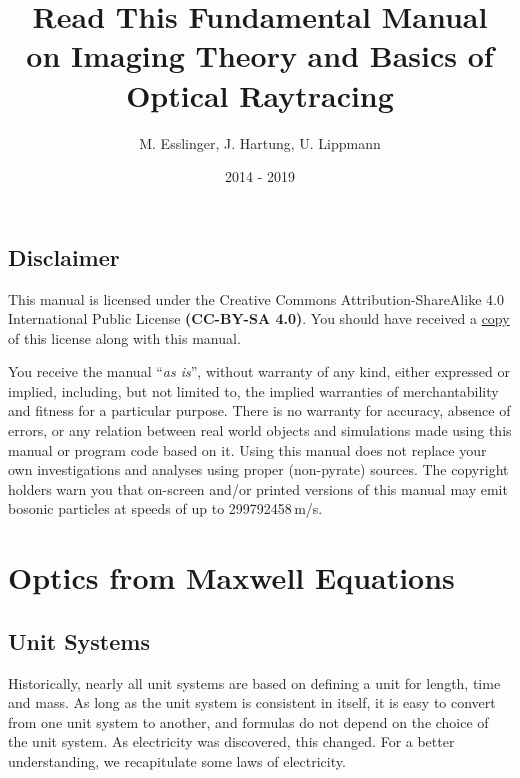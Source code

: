 \documentclass[12pt,a4paper,twoside,openright,BCOR10mm,headsepline,titlepage,abstracton,chapterprefix,final]{scrreprt}
\begin{document}

\titlehead{ }
\subject{Pyrate -- Optical raytracing based on Python}
\title{Read This Fundamental Manual \\ on Imaging Theory and Basics of Optical Raytracing}
\author{M. Esslinger, J. Hartung, U. Lippmann}
\date{2014 - 2019}
\publishers{}
\maketitle

\onehalfspacing

\tableofcontents

\cleardoublepage


\singlespacing

\section{Disclaimer}

This manual is licensed under the
Creative Commons Attribution-ShareAlike 4.0 International Public License
\textbf{(CC-BY-SA 4.0)}.
You should have received a \href{rtfm_license.html}{copy} of this license along with this manual.

You receive the manual ``\emph{as is}'', without warranty of any kind, either expressed or implied, 
including, but not limited to, the implied warranties of merchantability and fitness for a particular purpose.
There is no warranty for accuracy, absence of errors, or any relation between real world objects and simulations made 
using this manual or program code based on it.
Using this manual does not replace your own investigations and analyses using proper (non-pyrate) sources. 
The copyright holders warn you that on-screen and/or printed versions of this manual may emit bosonic particles at speeds of up to 299792458\,m/s.

\chapter{Optics from Maxwell Equations}
\section{Unit Systems}
Historically, nearly all unit systems are based on defining a unit for length, time and mass.
As long as the unit system is consistent in itself, 
it is easy to convert from one unit system to another, and formulas do not depend on the choice of the unit system.
As electricity was discovered, this changed.
For a better understanding, we recapitulate some laws of electricity.
\end{document}
